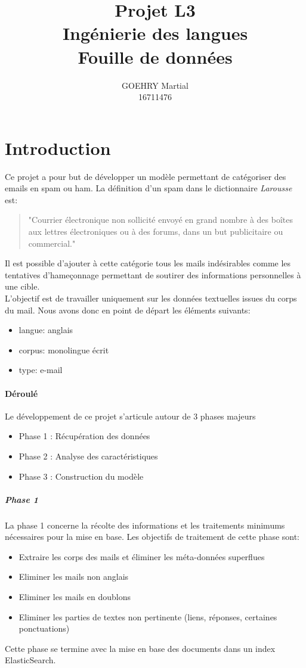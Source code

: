 \documentclass[a4paper,12pt]{article}
\title{Projet L3\\Ingénierie des langues\\Fouille de données}
\author{GOEHRY Martial\\16711476}
\begin{document}
	\maketitle
	\tableofcontents
	\newpage
	
\section{Introduction}
	Ce projet a pour but de développer un modèle permettant de catégoriser des emails en spam ou ham.
	La définition d'un spam dans le dictionnaire \emph{Larousse} est:
	
	\begin{quote}
	"Courrier électronique non sollicité envoyé en grand nombre à des boîtes aux lettres électroniques ou à des forums, dans un but publicitaire ou commercial."
	\end{quote}
	
	Il est possible d'ajouter à cette catégorie tous les mails indésirables comme les tentatives d'hameçonnage permettant de soutirer des informations personnelles à une cible.\\ 
	
	L'objectif est de travailler uniquement sur les données textuelles issues du corps du mail.
	Nous avons donc en point de départ les éléments suivants:
	\begin{itemize}
		\item langue: anglais
		\item corpus: monolingue écrit
		\item type: e-mail
	\end{itemize}
	
	\paragraph{Déroulé} Le développement de ce projet s'articule autour de 3 phases majeurs
		\begin{itemize}
			\item Phase 1 : Récupération des données
			\item Phase 2 : Analyse des caractéristiques
			\item Phase 3 : Construction du modèle
		\end{itemize}
		
	
	\subparagraph{Phase 1} La phase 1 concerne la récolte des informations et les traitements minimums nécessaires pour la mise en base. Les objectifs de traitement de cette phase sont:
	\begin{itemize}
		\item Extraire les corps des mails et éliminer les méta-données superflues
		\item Eliminer les mails non anglais
		\item Eliminer les mails en doublons
		\item Eliminer les parties de textes non pertinente (liens, réponses, certaines ponctuations)
	\end{itemize}
	Cette phase se termine avec la mise en base des documents dans un index ElasticSearch.
	
\end{document}
